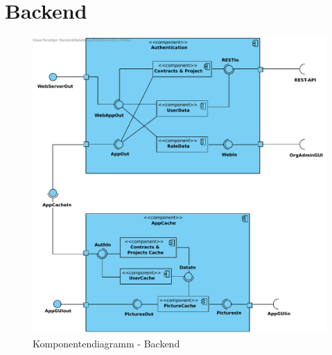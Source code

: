 

\section{Backend}

\begin{figure}[h!]
	\centering
	\includegraphics[width=\linewidth]{img/diagrams/cp_backend.pdf}		
	\caption{Komponentendiagramm - Backend}
	\label{fig:komponentendiagramm-backend}
\end{figure}

